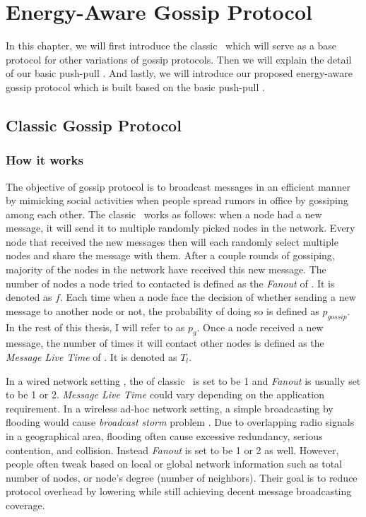 \chapter{Energy-Aware Gossip Protocol}
\label{Chapter3}

In this chapter, we will first introduce the classic \gp ~which will serve as a base protocol for other variations of gossip protocols. Then we will explain the detail of our basic push-pull \gp. And lastly, we will introduce our proposed energy-aware gossip protocol which is built based on the basic push-pull \gp.

\section{Classic Gossip Protocol}
\subsection{How it works} \label{basic gossip}

The objective of gossip protocol is to broadcast messages in an efficient manner by mimicking social activities when people spread rumors in office by gossiping among each other. The classic \gp ~works as follows: when a node had a new message, it will send it to multiple randomly picked nodes in the network. Every node that received the new messages then will each randomly select multiple nodes and share the message with them. After a couple rounds of gossiping, majority of the nodes in the network have received this new message. The number of nodes a node tried to contacted is defined as the \emph{Fanout} of \gp. It is denoted as $f$. Each time when a node face the decision of whether sending a new message to another node or not, the probability of doing so is defined as $p_{gossip}$. In the rest of this thesis, I will refer to \emph{\pog} as $p_g$. Once a node received a new message, the number of times it will contact other nodes is defined as the \emph{Message Live Time} of \gp. It is denoted as $T_l$.

In a wired network setting , the \emph{\pog} of classic \gp ~is set to be 1 and \emph{Fanout} is usually set to be 1 or 2. \emph{Message Live Time} could vary depending on the application requirement. In a wireless ad-hoc network setting, a simple broadcasting by flooding would cause \emph{broadcast storm} problem \cite{tseng2002broadcast}. Due to overlapping radio signals in a geographical area, flooding often cause excessive redundancy, serious contention, and collision. Instead \emph{Fanout} is set to be 1 or 2 as well. However, people often tweak \emph{\pog} based on local or global network information such as total number of nodes, or node's degree (number of neighbors). Their goal is to reduce protocol overhead by lowering \emph{\pog} while still achieving decent message broadcasting coverage. 

